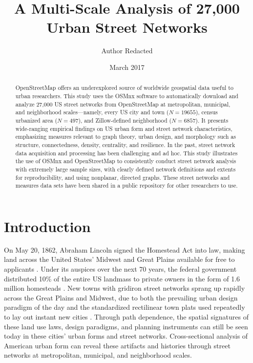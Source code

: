 \documentclass[Afour,sageh,times]{sagej}
\renewcommand{\cite}{\citep}
\begin{document}
\title{A Multi-Scale Analysis of 27,000 Urban Street Networks}
\author{Author Redacted}
\date{March 2017}
\maketitle



\begin{abstract}
	
OpenStreetMap offers an underexplored source of worldwide geospatial data useful to urban researchers. This study uses the OSMnx software to automatically download and analyze 27,000 US street networks from OpenStreetMap at metropolitan, municipal, and neighborhood scales---namely, every US city and town ($N=19655$), census urbanized area ($N=497$), and Zillow-defined neighborhood ($N=6857$). It presents wide-ranging empirical findings on US urban form and street network characteristics, emphasizing measures relevant to graph theory, urban design, and morphology such as structure, connectedness, density, centrality, and resilience. In the past, street network data acquisition and processing has been challenging and ad hoc. This study illustrates the use of OSMnx and OpenStreetMap to consistently conduct street network analysis with extremely large sample sizes, with clearly defined network definitions and extents for reproducibility, and using nonplanar, directed graphs. These street networks and measures data sets have been shared in a public repository for other researchers to use.

\end{abstract}



\section{Introduction}

On May 20, 1862, Abraham Lincoln signed the Homestead Act into law, making land across the United States' Midwest and Great Plains available for free to applicants \cite{porterfield_homestead_2005}. Under its auspices over the next 70 years, the federal government distributed 10\% of the entire US landmass to private owners in the form of 1.6 million homesteads \cite{lee_kansas_1979, sherraden_inclusion_2005}. New towns with gridiron street networks sprang up rapidly across the Great Plains and Midwest, due to both the prevailing urban design paradigm of the day and the standardized rectilinear town plats used repeatedly to lay out instant new cities \cite{southworth_streets_1997}. Through path dependence, the spatial signatures of these land use laws, design paradigms, and planning instruments can still be seen today in these cities' urban forms and street networks. Cross-sectional analysis of American urban form can reveal these artifacts and histories through street networks at metropolitan, municipal, and neighborhood scales.
\end{document}
